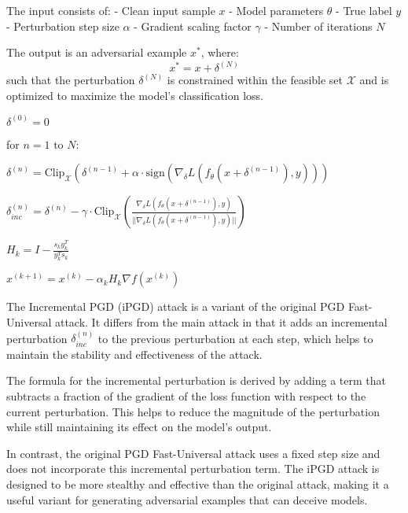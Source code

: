 The input consists of:
- Clean input sample $x$
- Model parameters $\theta$
- True label $y$
- Perturbation step size $\alpha$
- Gradient scaling factor $\gamma$
- Number of iterations $N$

The output is an adversarial example $x^*$, where:
\[
x^* = x + \delta^{(N)}
\]
such that the perturbation $\delta^{(N)}$ is constrained within the feasible set $\mathcal{X}$ and is optimized to maximize the model’s classification loss.


$\delta^{(0)} = 0$

for $n = 1 \text{ to } N$:

$\delta^{(n)} = \text{Clip}_{\mathcal{X}} \left( \delta^{(n-1)} + \alpha \cdot \text{sign} \left( \nabla_\delta L(f_\theta(x + \delta^{(n-1)}), y) \right) \right)$

$\delta_{inc}^{(n)} = \delta^{(n)} - \gamma \cdot \text{Clip}_{\mathcal{X}} \left( \frac{\nabla_\delta L(f_\theta(x + \delta^{(n-1)}), y)}{||\nabla_\delta L(f_\theta(x + \delta^{(n-1)}), y)||} \right)$

$H_k = I - \frac{s_k y_k^T}{y_k^T s_k}$

$x^{(k+1)} = x^{(k)} - \alpha_k H_k \nabla f(x^{(k)})$


The Incremental PGD (iPGD) attack is a variant of the original PGD Fast-Universal attack. It differs from the main attack in that it adds an incremental perturbation $\delta_{inc}^{(n)}$ to the previous perturbation at each step, which helps to maintain the stability and effectiveness of the attack.

The formula for the incremental perturbation is derived by adding a term that subtracts a fraction of the gradient of the loss function with respect to the current perturbation. This helps to reduce the magnitude of the perturbation while still maintaining its effect on the model's output.

In contrast, the original PGD Fast-Universal attack uses a fixed step size and does not incorporate this incremental perturbation term. The iPGD attack is designed to be more stealthy and effective than the original attack, making it a useful variant for generating adversarial examples that can deceive models.